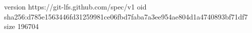 version https://git-lfs.github.com/spec/v1
oid sha256:d785e1563446fd31259981ce06fbd7faba7a3ee954ae804d1a4740893bf71df7
size 196704
